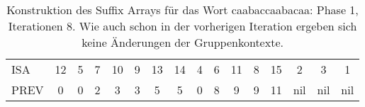 \begin{table}[H]
\begin{adjustbox}{max width=\textwidth}
\begin{tabular}{lccccccccccccccc}
\multicolumn{1}{l|}{ISA}     & 12                      & 5  & 7                       & 10                         & 9                           & 13                        & 14                         & 4                         & 6                        & 11 & 8                       & 15  & 2   & 3   & 1   \\
\multicolumn{1}{l|}{PREV}    & 0                       & 0  & 2                       & 3                          & 3                           & 5                         & 5                          & \cellcolor[HTML]{\red}0 & 8                        & 9  & 9                       & 11  & nil & nil & nil
\end{tabular}
\end{adjustbox}

\caption[Konstruktion des Suffix Arrays für das Wort caabaccaabacaa: Phase 1, Iterationen 8]{Konstruktion des Suffix Arrays für das Wort caabaccaabacaa: Phase 1, Iterationen 8. Wie auch schon in der vorherigen Iteration ergeben sich keine Änderungen der Gruppenkontexte.}
\label{table_complex_example_1_8} 
\end{table}

